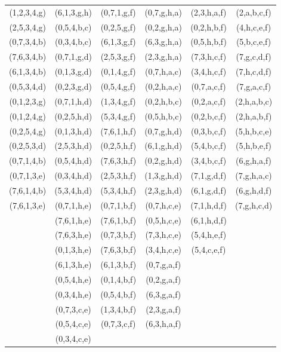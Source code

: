\documentclass[12pt,a4paper]{article}
\theoremstyle{plain}
\theoremstyle{definition}
\begin{document}
\begin{tabular} {c|cc|cc|c}
(1,2,3,4,g) & (6,1,3,g,h) & (0,7,1,g,f) & (0,7,g,h,a) & (2,3,h,a,f) & (2,a,b,c,f) \\
(2,5,3,4,g) & (0,5,4,b,c) & (0,2,5,g,f) & (0,2,g,h,a) & (0,2,h,b,f) & (4,h,c,e,f) \\
(0,7,3,4,b) & (0,3,4,b,c) & (6,1,3,g,f) & (6,3,g,h,a) & (0,5,h,b,f) & (5,b,c,e,f) \\
(7,6,3,4,b) & (0,7,1,g,d) & (2,5,3,g,f) & (2,3,g,h,a) & (7,3,h,c,f) & (7,g,c,d,f) \\
(6,1,3,4,b) & (0,1,3,g,d) & (0,1,4,g,f) & (0,7,h,a,c) & (3,4,h,c,f) & (7,h,c,d,f) \\
(0,5,3,4,d) & (0,2,3,g,d) & (0,5,4,g,f) & (0,2,h,a,c) & (0,7,a,c,f) & (7,g,a,c,f) \\
(0,1,2,3,g) & (0,7,1,h,d) & (1,3,4,g,f) & (0,2,h,b,c) & (0,2,a,c,f) & (2,h,a,b,c) \\
(0,1,2,4,g) & (0,2,5,h,d) & (5,3,4,g,f) & (0,5,h,b,c) & (0,2,b,c,f) & (2,h,a,b,f) \\
(0,2,5,4,g) & (0,1,3,h,d) & (7,6,1,h,f) & (0,7,g,h,d) & (0,3,b,c,f) & (5,h,b,c,e) \\
(0,2,5,3,d) & (2,5,3,h,d) & (0,2,5,h,f) & (6,1,g,h,d) & (5,4,b,c,f) & (5,h,b,e,f) \\
(0,7,1,4,b) & (0,5,4,h,d) & (7,6,3,h,f) & (0,2,g,h,d) & (3,4,b,c,f) & (6,g,h,a,f) \\
(0,7,1,3,e) & (0,3,4,h,d) & (2,5,3,h,f) & (1,3,g,h,d) & (7,1,g,d,f) & (7,g,h,a,c) \\
(7,6,1,4,b) & (5,3,4,h,d) & (5,3,4,h,f) & (2,3,g,h,d) & (6,1,g,d,f) & (6,g,h,d,f) \\
(7,6,1,3,e) & (0,7,1,h,e) & (0,7,1,b,f) & (0,7,h,c,e) & (7,1,h,d,f) & (7,g,h,c,d) \\
            & (7,6,1,h,e) & (7,6,1,b,f) & (0,5,h,c,e) & (6,1,h,d,f) &             \\
            & (7,6,3,h,e) & (0,7,3,b,f) & (7,3,h,c,e) & (5,4,h,e,f) &             \\
            & (0,1,3,h,e) & (7,6,3,b,f) & (3,4,h,c,e) & (5,4,c,e,f) &             \\
            & (6,1,3,h,e) & (6,1,3,b,f) & (0,7,g,a,f) &             &             \\
            & (0,5,4,h,e) & (0,1,4,b,f) & (0,2,g,a,f) &             &             \\
            & (0,3,4,h,e) & (0,5,4,b,f) & (6,3,g,a,f) &             &             \\
            & (0,7,3,c,e) & (1,3,4,b,f) & (2,3,g,a,f) &             &             \\
            & (0,5,4,c,e) & (0,7,3,c,f) & (6,3,h,a,f) &             &             \\
            & (0,3,4,c,e) &             &             &             &             
\end{tabular}
\end{document}
